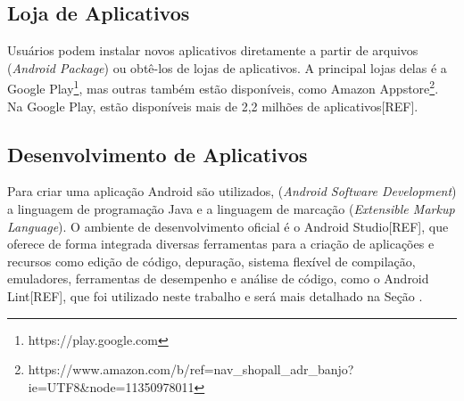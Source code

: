 \subsection{Loja de Aplicativos} \label{subsec:loja-aplicativos}

Usuários podem instalar novos aplicativos diretamente a partir de arquivos 
(\textit{Android Package}) ou obtê-los de lojas de aplicativos. A principal
lojas delas é a Google Play\footnote{https://play.google.com}, mas outras também
estão disponíveis, como Amazon Appstore\footnote{https://www.amazon.com/b/ref=nav\_shopall\_adr\_banjo?ie=UTF8\&node=11350978011}.
Na Google Play, estão disponíveis mais de 2,2 milhões de aplicativos[REF].

\subsection{Desenvolvimento de Aplicativos} \label{subsec:desenvolvimento-aplicativos}

Para criar uma aplicação Android são utilizados, 
(\textit{Android Software Development})
a linguagem de programação Java e a linguagem de marcação
(\textit{Extensible Markup Language}). O ambiente de desenvolvimento oficial
é o Android Studio[REF], que oferece de forma integrada diversas ferramentas para
a criação de aplicações e recursos como edição de código, depuração, sistema flexível
de compilação, emuladores, ferramentas de desempenho e análise de código, como o
Android Lint[REF], que foi utilizado neste trabalho e será mais detalhado na Seção \label{subsec:android-lint}.


